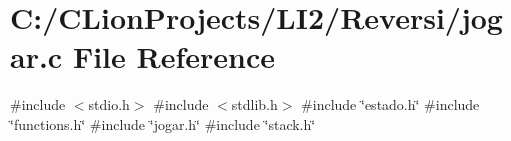 \section{C\+:/\+C\+Lion\+Projects/\+L\+I2/\+Reversi/jogar.c File Reference}
\label{jogar_8c}
{\ttfamily \#include $<$stdio.\+h$>$}\newline
{\ttfamily \#include $<$stdlib.\+h$>$}\newline
{\ttfamily \#include \char`\"{}estado.\+h\char`\"{}}\newline
{\ttfamily \#include \char`\"{}functions.\+h\char`\"{}}\newline
{\ttfamily \#include \char`\"{}jogar.\+h\char`\"{}}\newline
{\ttfamily \#include \char`\"{}stack.\+h\char`\"{}}\newline
